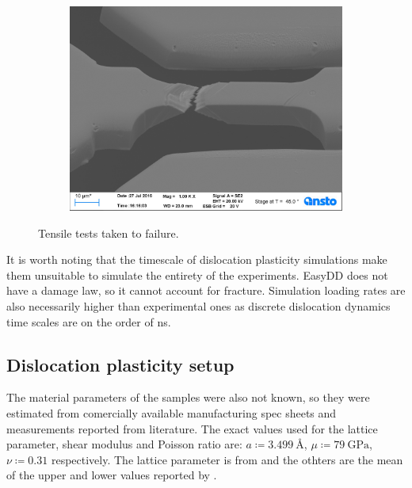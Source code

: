 \begin{figure}
\begin{subfigure}[t]{0.3\linewidth}
        \includegraphics[width=\linewidth]{../data/Ni039.jpg}
    \end{subfigure}
    \caption{Tensile tests taken to failure.}
    \label{f:tensileFailure}
\end{figure}

It is worth noting that the timescale of dislocation plasticity simulations make them unsuitable to simulate the entirety of the experiments. EasyDD does not have a damage law, so it cannot account for fracture. Simulation loading rates are also necessarily higher than experimental ones as discrete dislocation dynamics time scales are on the order of \si{\nano\second}.

\subsection{Dislocation plasticity setup}
\label{ss:modelSetup}

The material parameters of the samples were also not known, so they were estimated from comercially available manufacturing spec sheets and measurements reported from literature. The exact values used for the lattice parameter, shear modulus and Poisson ratio are: $a \coloneqq \SI{3.499}{\angstrom}$, $ \mu  \coloneqq \SI{79}{\giga\pascal}$, $\nu \coloneqq 0.31$ respectively. The lattice parameter is from \cite{ni_lattice} and the othters are the mean of the upper and lower values reported by \cite{azom_nickel}.

